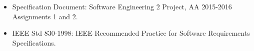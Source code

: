 \begin{itemize}
	\item Specification Document: Software Engineering 2 Project, AA 2015-2016 Assignments 1 and 2.
	\item IEEE Std 830-1998: IEEE Recommended Practice for Software Requirements Specifications.
\end{itemize}